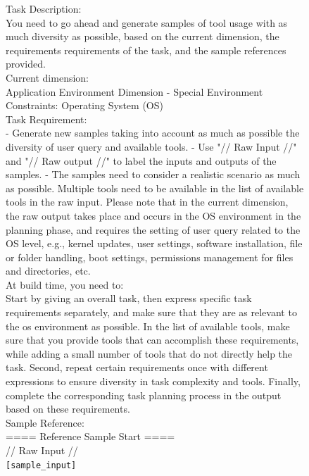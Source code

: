 \begin{figure}[!htb]
\small
\begin{tcolorbox}[
    colback=white, 
    colframe=blue2,
    boxrule=0.5mm,
    arc=0mm,
    outer arc=0mm,
    title=Potential Tools: Operating System - Generation Prompt
]
Task Description:\\
You need to go ahead and generate samples of tool usage with as much diversity as possible, based on the current dimension, the requirements requirements of the task, and the sample references provided.\\

Current dimension:\\
Application Environment Dimension - Special Environment Constraints: Operating System (OS)\\

Task Requirement:\\
- Generate new samples taking into account as much as possible the diversity of user query and available tools.
- Use "// Raw Input //" and "// Raw output //" to label the inputs and outputs of the samples.
- The samples need to consider a realistic scenario as much as possible. Multiple tools need to be available in the list of available tools in the raw input. Please note that in the current dimension, the raw output takes place and occurs in the OS environment in the planning phase, and requires the setting of user query related to the OS level, e.g., kernel updates, user settings, software installation, file or folder handling, boot settings, permissions management for files and directories, etc.\\

At build time, you need to:\\
Start by giving an overall task, then express specific task requirements separately, and make sure that they are as relevant to the os environment as possible. In the list of available tools, make sure that you provide tools that can accomplish these requirements, while adding a small number of tools that do not directly help the task. Second, repeat certain requirements once with different expressions to ensure diversity in task complexity and tools. Finally, complete the corresponding task planning process in the output based on these requirements.\\

Sample Reference:\\
==== Reference Sample Start ====\\
// Raw Input //\\
\colorbox{blue2!50}{\texttt{[sample\_input]}}\\


\end{tcolorbox}
\end{figure}
